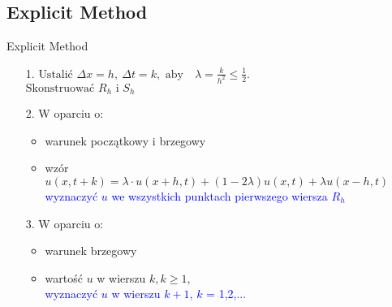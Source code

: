 
\subsection{Explicit Method}
\begin{frame}{Explicit Method}

\begin{block}{}
\begin{flushleft}
    \begin{enumerate}
      \item [1.]  
   $\text{Ustalić } \Delta x = h , \ \Delta t = k , \text{ aby} \quad \lambda = \frac{k}{h^2} \leq \frac{1}{2} . $\\ $\text{Skonstruować } R_h \text{ i } S_h $
      
      \item [2.] W oparciu o: \begin{itemize}
\item warunek początkowy i brzegowy
\item wzór $u(x, t+k) = \lambda \cdot u(x+h, t) + (1 - 2\lambda) u (x,t) + \lambda u(x-h, t)$ \\
\textcolor{blue}{wyznaczyć $u$ we wszystkich punktach pierwszego wiersza $R_h$}
\end{itemize} 
	\item [3.] W oparciu o:
\begin{itemize}
\item warunek brzegowy
\item wartość $u$ w wierszu $k, k \geq 1, $ \\
\textcolor{blue}{wyznaczyć $u$ w wierszu $k+1$, $k$ = 1,2,...}
\end{itemize}
    \end{enumerate}
\end{flushleft}
  \end{block}

 
\end{frame}

